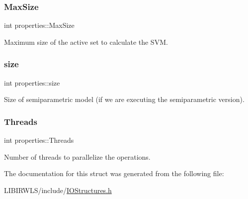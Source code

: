 \subsubsection{\texorpdfstring{Max\+Size}{MaxSize}}
{\ttfamily int properties\+::\+Max\+Size}

Maximum size of the active set to calculate the S\+VM. \hypertarget{structproperties_a1694aebbbdd904f9b0e5faca725966b6}{}\label{structproperties_a1694aebbbdd904f9b0e5faca725966b6} 
\subsubsection{\texorpdfstring{size}{size}}
{\ttfamily int properties\+::size}

Size of semiparametric model (if we are executing the semiparametric version). \hypertarget{structproperties_a56ab77c44fb808e71990074bd75529ed}{}\label{structproperties_a56ab77c44fb808e71990074bd75529ed} 
\subsubsection{\texorpdfstring{Threads}{Threads}}
{\ttfamily int properties\+::\+Threads}

Number of threads to parallelize the operations. 

The documentation for this struct was generated from the following file\+:\begin{DoxyCompactItemize}
\item 
L\+I\+B\+I\+R\+W\+L\+S/include/\hyperlink{IOStructures_8h}{I\+O\+Structures.\+h}\end{DoxyCompactItemize}
